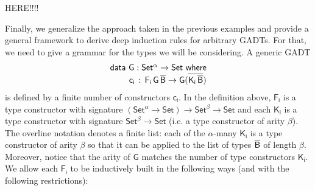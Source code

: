 \documentclass[9pt]{entcs}
\begin{document}
{\color{red} HERE!!!!}

Finally, we generalize the approach taken in the previous examples and
provide a general framework to derive deep induction rules for
arbitrary GADTs.  For that, we need to give a grammar for the types we
will be considering.  A generic GADT
\begin{equation*}
\begin{array}{l}
\mathsf{data\ G : Set^\alpha \to Set\ where}\\
\mathsf{\;\;\;\;\;\;\;\;c_i\, :\, F_i\,G\,\overline{B} \to G (\overline{K_i\,\overline{B}})}
\end{array}
\end{equation*}
is defined by a finite number of constructors $\mathsf{c_i}$.
In the definition above, $\mathsf{F_i}$ is a type constructor with signature $\mathsf{(Set^{\alpha} \to Set) \to Set^{\beta} \to Set}$
and each $\mathsf{K_i}$ is a type constructor with signature $\mathsf{Set^{\beta} \to Set}$
(i.e. a type constructor of arity $\mathsf{\beta}$).
The overline notation denotes a finite list:
each of the $\mathsf{\alpha}$-many $\mathsf{K_i}$ is a type constructor of arity $\mathsf{\beta}$
so that it can be applied to the list of types $\mathsf{\overline{B}}$ of length $\mathsf{\beta}$.
Moreover, notice that the arity of $\mathsf{G}$ matches the number of type constructors $\mathsf{K_i}$.
We allow each $\mathsf{F_i}$ to be inductively built in the following ways (and with the following restrictions):
\end{document}

